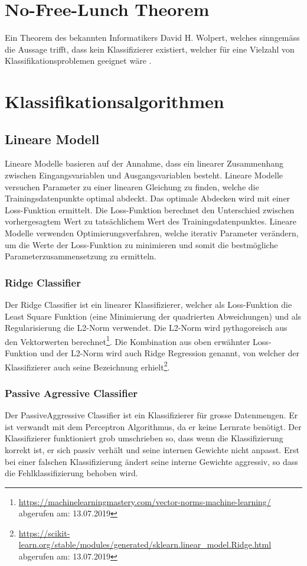 \section{No-Free-Lunch Theorem}\label{sec:nofreelunch}
Ein Theorem des bekannten Informatikers David H. Wolpert, welches sinngemäss die Aussage trifft, dass kein Klassifizierer existiert, welcher für eine Vielzahl von Klassifikationsproblemen geeignet wäre \cite[1341-1390]{Wolpert1996TheLO}.

\section{Klassifikationsalgorithmen}\label{sec:algos}
\subsection{Lineare Modell}
Lineare Modelle basieren auf der Annahme, dass ein linearer Zusammenhang zwischen Eingangsvariablen und Ausgangsvariablen besteht.
Lineare Modelle versuchen Parameter zu einer linearen Gleichung zu finden, welche die Trainingsdatenpunkte optimal abdeckt.
Das optimale Abdecken wird mit einer Loss-Funktion ermittelt.
Die Loss-Funktion berechnet den Unterschied zwischen vorhergesagtem Wert zu tatsächlichem Wert des Trainingsdatenpunktes.
Lineare Modelle verwenden Optimierungsverfahren, welche iterativ Parameter verändern, um die Werte der Loss-Funktion zu minimieren und somit die bestmögliche Parameterzusammensetzung zu ermitteln.
\subsubsection{Ridge Classifier}
Der Ridge Classifier ist ein linearer Klassifizierer, welcher als Loss-Funktion die \glqq Least Square\grqq{} Funktion (eine Minimierung der quadrierten Abweichungen) und als Regularisierung die L2-Norm verwendet. Die L2-Norm wird pythagoreisch aus den Vektorwerten berechnet\footnote{\url{https://machinelearningmastery.com/vector-norms-machine-learning/} abgerufen am: 13.07.2019}.
Die Kombination aus oben erwähnter Loss-Funktion und der L2-Norm wird auch \glqq Ridge Regression\grqq{} genannt, von welcher der Klassifizierer auch seine Bezeichnung erhielt\footnote{\url{https://scikit-learn.org/stable/modules/generated/sklearn.linear_model.Ridge.html} abgerufen am: 13.07.2019}\cite{scikit-learn}.
\subsubsection{Passive Agressive Classifier}
Der PassiveAggressive Classifier ist ein Klassifizierer für grosse Datenmengen.
Er ist verwandt mit dem Perceptron Algorithmus, da er keine Lernrate benötigt.
Der Klassifizierer funktioniert grob umschrieben so, dass wenn die Klassifizierung korrekt ist, er sich passiv verhält und seine internen Gewichte nicht anpasst.
Erst bei einer falschen Klassifizierung ändert seine interne Gewichte aggressiv, so dass die Fehlklassifizierung behoben wird\cite{crammer2006online}.
